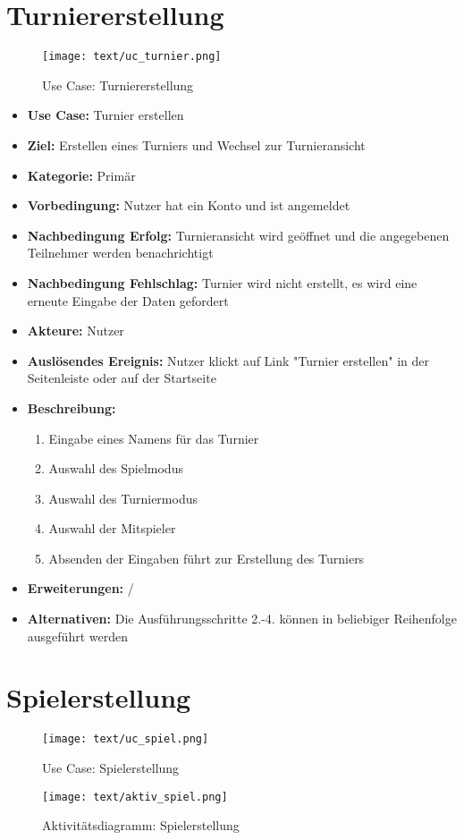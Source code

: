 \section{Turniererstellung}
\begin{figure}[h!]
	\centering
	\texttt{[image: text/uc\_turnier.png]}
	\caption{Use Case: Turniererstellung}
	\label{uc_turnier}
\end{figure}
\begin{itemize}
	\item \textbf{Use Case:} Turnier erstellen
	\item \textbf{Ziel:} Erstellen eines Turniers und Wechsel zur Turnieransicht
	\item \textbf{Kategorie:} Primär
	\item \textbf{Vorbedingung:} Nutzer hat ein Konto und ist angemeldet
	\item \textbf{Nachbedingung Erfolg:} Turnieransicht wird geöffnet und die angegebenen Teilnehmer werden benachrichtigt
	\item \textbf{Nachbedingung Fehlschlag:} Turnier wird nicht erstellt, es wird eine erneute Eingabe der Daten gefordert
	\item \textbf{Akteure:} Nutzer
	\item \textbf{Auslösendes Ereignis:} Nutzer klickt auf Link "Turnier erstellen" in der Seitenleiste oder auf der Startseite
	\item \textbf{Beschreibung:} \begin{enumerate}
		\item Eingabe eines Namens für das Turnier
		\item Auswahl des Spielmodus
		\item Auswahl des Turniermodus
		\item Auswahl der Mitspieler
		\item Absenden der Eingaben führt zur Erstellung des Turniers
	\end{enumerate}
	\item \textbf{Erweiterungen:} /
	\item \textbf{Alternativen:} Die Ausführungsschritte 2.-4. können in beliebiger Reihenfolge ausgeführt werden
\end{itemize}


\section{Spielerstellung}
\begin{figure}[h!]
	\centering
	\texttt{[image: text/uc\_spiel.png]}
	\caption{Use Case: Spielerstellung}
	\label{uc_spiel}
\end{figure}
\begin{figure}[h!]
	\centering
	\texttt{[image: text/aktiv\_spiel.png]}
	\caption{Aktivitätsdiagramm: Spielerstellung}
	\label{aktiv_spiel}
\end{figure}


